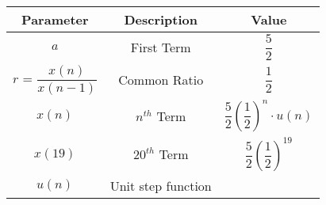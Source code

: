\begin{tabular}{|c|c|c|}
    \hline
    \textbf{Parameter} & \textbf{Description} & \textbf{Value} \\
    \hline
     \(a\) & First Term &\(\dfrac{5}{2}\) \\
    \hline
     \(r\) = \(\dfrac{x(n)}{x(n-1)}\) & Common Ratio & \(\dfrac{1}{2}\) \\
    \hline
      \(x(n)\) & \(n^{th}\) Term & \(\dfrac{5}{2}\left(\dfrac{1}{2}\right)^n \cdot u(n)\) \\
    \hline
     \(x(19)\) & \(20^{th}\) Term &\(\dfrac{5}{2} \left(\dfrac{1}{2}\right)^{19}\) \\
    \hline
     \(u(n)\) &Unit step function & \\
    \hline
  \end{tabular}
